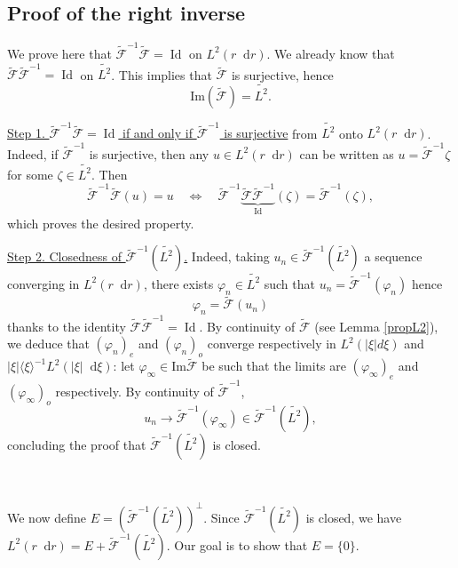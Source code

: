\documentclass[11 pt]{amsart}
\newcommand{\tmem}{\underline}
\newcommand{\tmop}[1]{\ensuremath{\operatorname{#1}}}
\theoremstyle{definition}
\theoremstyle{remark}
\numberwithin{equation}{section}
\newcommand{\dd}{\mathop{}\!\mathrm{d}}
\begin{document}
\subsection{Proof of the right inverse} \label{subsecii} We prove here that $\widetilde{\mathcal{F}}^{- 1} \widetilde{\mathcal{F}}= \tmop{Id}$ on $L^2(r \dd r)$. We already know that $\widetilde{\mathcal{F}} \widetilde{\mathcal{F}}^{-1} = \tmop{Id}$ on $\widetilde{L^2}$. This implies that $\widetilde{\mathcal{F}}$ is surjective, hence
  \[ \textrm{Im}(\widetilde{\mathcal{F}}) = \widetilde{L^2} . \]
  
\noindent 
\tmem{Step 1. $\widetilde{\mathcal{F}}^{- 1} \widetilde{\mathcal{F}} = \tmop{Id}$ if and only if $\widetilde{\mathcal{F}}^{- 1}$ is surjective} from $\widetilde{L^2}$ onto $L^2 (r \dd r)$. Indeed, if $\widetilde{\mathcal{F}}^{- 1}$ is surjective, then any $u \in L^2(r\dd r)$ can be written as $u =\widetilde{\mathcal{F}}^{- 1} \zeta$ for some $\zeta \in \widetilde{L^2}$. Then
$$
 \widetilde{\mathcal{F}}^{- 1} \widetilde{\mathcal{F}} (u) = u \quad \Leftrightarrow \quad \widetilde{\mathcal{F}}^{- 1} \underbrace{\widetilde{\mathcal{F}} \widetilde{\mathcal{F}}^{- 1}}_{\displaystyle \mathrm{Id}}(\zeta) = \widetilde{\mathcal{F}}^{- 1}(\zeta),
$$
which proves the desired property.


\medskip 
\noindent  
  \tmem{Step 2. Closedness of $\widetilde{\mathcal{F}}^{- 1} (\widetilde{L^2})$.} Indeed, taking $u_n \in \widetilde{\mathcal{F}}^{- 1}
  (\widetilde{L^2})$ a sequence converging in $L^2(r \dd r)$, there exists
  $\varphi_n \in \widetilde{L^2} $ such that $u_n = \widetilde{\mathcal{F}}^{- 1} (\varphi_n)$ hence
  \[ \varphi_n = \widetilde{\mathcal{F}} (u_n) \]
  thanks to the identity $\widetilde{\mathcal{F}} \widetilde{\mathcal{F}}^{- 1} =
  \tmop{Id}$. By continuity of $\widetilde{\mathcal{F}}$ (see Lemma
  \ref{propL2}), we deduce that $(\varphi_n)_e$ and $(\varphi_n)_o$ converge respectively in $L^2 (| \xi | d
  \xi)$ and $| \xi | \langle \xi \rangle^{- 1} L^2 (| \xi | \dd \xi)$: let $\varphi_\infty \in \textrm{Im} \widetilde{\mathcal{F}}$ be such that the limits are $(\varphi_\infty)_e$ and $(\varphi_\infty)_o$ respectively. By continuity of $\widetilde{\mathcal{F}}^{- 1}$,
  \[ u_n \rightarrow \widetilde{\mathcal{F}}^{- 1} (\varphi_{\infty}) \in
     \widetilde{\mathcal{F}}^{- 1} (\widetilde{L^2}), \]
  concluding the proof that $\widetilde{\mathcal{F}}^{- 1} (\widetilde{L^2})$ is closed.
  
  \
  
We now define $E = (\widetilde{\mathcal{F}}^{- 1} (
\widetilde{L^2}))^{\bot}$. Since $\widetilde{\mathcal{F}}^{- 1} (\widetilde{L^2})$ is closed, we have $L^2 (r \dd r) = E + \widetilde{\mathcal{F}}^{- 1} (\widetilde{L^2})$. Our goal is to show that $E = \{ 0 \}$.
\end{document}
